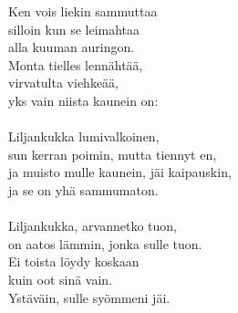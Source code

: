 
        Ken vois liekin sammuttaa \\
        silloin kun se leimahtaa \\
        alla kuuman auringon. \\
        Monta tielles lennähtää, \\
        virvatulta viehkeää, \\
        yks vain niista kaunein on: \\
\hspace{10mm} \\
        Liljankukka lumivalkoinen, \\
        sun kerran poimin, mutta tiennyt en, \\
        ja muisto mulle kaunein, jäi kaipauskin, \\
        ja se on yhä sammumaton. \\
\hspace{10mm} \\
        Liljankukka, arvannetko tuon, \\
        on aatos lämmin, jonka sulle tuon. \\
        Ei toista löydy koskaan \\
        kuin oot sinä vain. \\
        Ystäväin, sulle syömmeni jäi. \\
